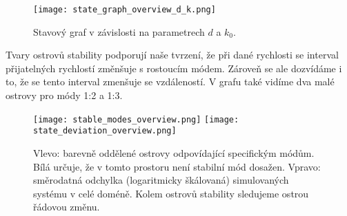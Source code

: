 \begin{figure}[H]
    \texttt{[image: state\_graph\_overview\_d\_k.png]}
    \centering
    \caption{Stavový graf v závislosti na parametrech $d$ a $k_0$.}
    \label{fig:state_graph_whole}
\end{figure}

\clearpage

Tvary ostrovů stability podporují naše tvrzení, že při dané rychlosti se interval přijatelných rychlostí změnšuje s rostoucím módem. Zároveň se ale dozvídáme i to, že se tento interval zmenšuje se vzdáleností. V grafu také vidíme dva malé ostrovy pro módy 1:2 a 1:3.

\begin{figure}[H]
    \texttt{[image: stable\_modes\_overview.png]}
    \texttt{[image: state\_deviation\_overview.png]}
    \centering
    \caption[Barevné oddělení ostrovů stabilních módů a směrodatná odchylka.]{Vlevo: barevně oddělené ostrovy odpovídající specifickým módům. Bílá určuje, že v tomto prostoru není stabilní mód dosažen. Vpravo: směrodatná odchylka (logaritmicky škálovaná) simulovaných systému v celé doméně. Kolem ostrovů stability sledujeme ostrou řádovou změnu.}
    \label{fig:state_graph_whole}
\end{figure}